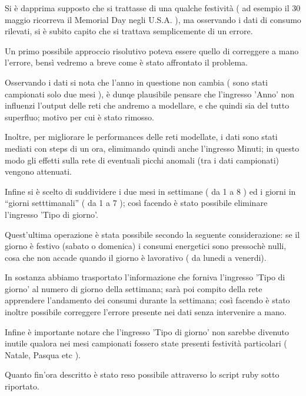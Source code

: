 Si è dapprima supposto che si trattasse di una qualche festività ( ad esempio il 30 maggio ricorreva il Memorial Day negli U.S.A. ), ma osservando i dati di consumo rilevati, si è subito capito che si trattava semplicemente di un errore.

Un primo possibile approccio risolutivo poteva essere quello di correggere a mano l'errore, bensì vedremo a breve come è stato affrontato il problema.

Osservando i dati si nota che l'anno in questione non cambia ( sono stati campionati solo due mesi ), è dunqe plausibile pensare che l'ingresso 'Anno' non influenzi l'output delle reti che andremo a modellare, e che quindi sia del tutto superfluo; motivo per cui è stato rimosso.

Inoltre, per migliorare le performances delle reti modellate, i dati sono stati mediati con steps di un ora, elimimando quindi anche l'ingresso Minuti; in questo modo gli effetti sulla rete di eventuali picchi anomali (tra i dati campionati) vengono attenuati.

Infine si è scelto di suddividere i due mesi in settimane ( da 1 a 8 ) ed i giorni in “giorni setttimanali” ( da 1 a 7 ); così facendo è stato possibile eliminare l'ingresso 'Tipo di giorno'.

Quest'ultima operazione è stata possibile secondo la seguente considerazione: se il giorno è festivo (sabato o domenica) i consumi energetici sono pressochè nulli, cosa che non accade quando il giorno è lavorativo ( da lunedi a venerdi). 

In sostanza abbiamo trasportato l'informazione che forniva l'ingresso 'Tipo di giorno' al numero di giorno della settimana; sarà poi compito della rete apprendere l'andamento dei consumi durante la settimana; così facendo è stato inoltre possibile correggere l'errore presente nei dati senza intervenire a mano.

Infine è importante notare che l'ingresso 'Tipo di giorno' non sarebbe divenuto inutile qualora nei mesi campionati fossero state presenti festività particolari ( Natale, Pasqua etc ).

Quanto fin'ora descritto è stato reso possibile attraverso lo script ruby sotto riportato.

\inputminted[linenos=true,fontsize=\footnotesize]{ruby}{../../data/conform.rb}


\clearpage

